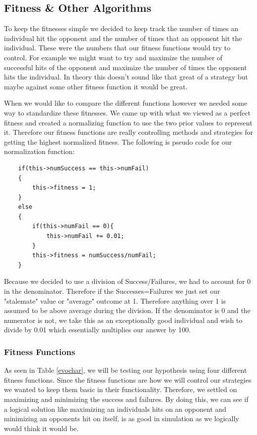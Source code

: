\documentclass{acm_proc_article-sp}
\begin{document}
\subsection{Fitness \& Other Algorithms} %

To keep the fitnesses simple we decided to keep track the number of times an individual hit the opponent and the number of times that an opponent hit the individual. These were the numbers that our fitness functions would try to control. For example we might want to try and maximize the number of successful hits of the opponent and maximize the number of times the opponent hits the individual. In theory this doesn't sound like that great of a strategy but maybe against some other fitness function it would be great.

When we would like to compare the different functions however we needed some way to standardize these fitnesses. We came up with what we viewed as a perfect fitness and created a normalizing function to use the two prior values to represent it. Therefore our fitness functions are really controlling methods and strategies for getting the highest normalized fitness. The following is pseudo code for our normalization function:
\begin{lstlisting}
    if(this->numSuccess == this->numFail)
    {
        this->fitness = 1;
    }
    else
    {
        if(this->numFail == 0){
            this->numFail += 0.01;
        }
        this->fitness = numSuccess/numFail;
    }
\end{lstlisting}
Because we decided to use a division of Success/Failures, we had to account for 0 in the denominator. Therefore if the Successes=Failures we just set our "stalemate" value or "average" outcome at 1. Therefore anything over 1 is assumed to be above average during the division. If the denominator is 0 and the numerator is not, we take this as an exceptionally good individual and wish to divide by 0.01 which essentially multiplies our answer by 100.

\subsubsection{Fitness Functions}

As seen in Table \ref{evochar}, we will be testing our hypothesis using four different fitness functions. Since the fitness functions are how we will control our strategies we wanted to keep them basic in their functionality. Therefore, we settled on maximizing and minimizing the success and failures. By doing this, we can see if a logical solution like maximizing an individuals hits on an opponent and minimizing an opponents hit on itself, is as good in simulation as we logically would think it would be.
\end{document}
